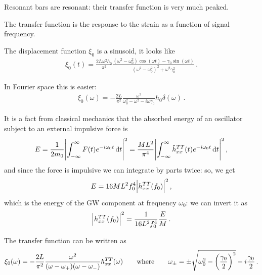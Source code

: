 \documentclass[main.tex]{subfiles}
\begin{document}


Resonant bars are resonant: their transfer function is very much peaked. 

The transfer function is the response to the strain as a function of signal frequency.

The displacement function \(\xi_0 \) is a sinusoid, it looks like 
%
\begin{align}
\xi_0 (t) = \frac{2 L \omega^2 h_0 }{\pi^2} \frac{(\omega^2 - \omega^2_{0}) \cos(\omega t) - \gamma_0 \sin(\omega t)}{(\omega^2-\omega_0^2)^2 + \omega^2 \gamma_0^2}
\,.
\end{align}

In Fourier space this is easier: 
%
\begin{align}
\xi_0 (\omega ) = - \frac{2L}{\pi^2} \frac{\omega^2}{\omega_0^2 - \omega^2 - i \omega \gamma_0 } h_0 \delta (\omega )
\,.
\end{align}

It is a fact from classical mechanics that the absorbed energy of an oscillator subject to an external impulsive force is 
%
\begin{align}
E 
= \frac{1}{2 m_0 } \abs{ \int_{ - \infty }^{ \infty  } F(t) e^{-i \omega_0 t} \dd{t}}^2
= \frac{ML^2}{\pi^{4} } \abs{ \int_{ - \infty }^{ \infty  } \ddot{h}_{xx}^{TT}(t) e^{-i \omega_0 t} \dd{t}}^2
\,,
\end{align}
%
and since the force is impulsive we can integrate by parts twice: so, we get 
%
\begin{align}
E = 16 M L^2 f_0^{4} \abs{h_{xx}^{TT} (f_0 )}^2
\,,
\end{align}
%
which is the energy of the GW component at frequency \(\omega_0 \): we can invert it as 
%
\begin{align}
\abs{h_{xx}^{TT} (f_0 )}^2 = \frac{1}{16L^2 f_0^{4}} \frac{E}{M}
\,.
\end{align}

The transfer function can be written as 
%
\begin{align}
\xi_0 (\omega ) = - \frac{2L}{\pi^2} \frac{\omega^2}{(\omega - \omega_{+}) (\omega-\omega_{-})} h^{TT}_{xx} (\omega )
\qquad \text{where} \qquad
\omega_{\pm} = \pm \sqrt{\omega_0 ^2 - \qty(\frac{\gamma_0 }{2})^2} - i \frac{\gamma_0 }{2}
\,.
\end{align}
\end{document}
